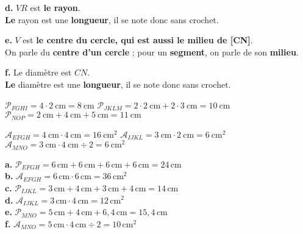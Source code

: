 \documentclass[a4paper,12pt]{report}
\begin{document}
\begin{Correction}
\begin{EXO}{}{}
\medskip
\textbf {d.} $VR$ est {\bfseries \color[HTML]{f15929}le rayon}.\\{\bfseries \color{blue}Le} rayon est une {\bfseries \color{blue}longueur}, il se note donc sans crochet.

\medskip
\textbf {e.} $V$ est {\bfseries \color[HTML]{f15929}le centre du cercle, qui est aussi le milieu de [CN]}.\\On parle du {\bfseries \color{blue}centre d'un cercle} ; pour un {\bfseries \color{blue}segment}, on parle de son {\bfseries \color{blue}milieu}.

\medskip
\textbf {f.} Le diamètre est {\bfseries \color[HTML]{f15929}$CN$}.\\{\bfseries \color{blue}Le} diamètre est une {\bfseries \color{blue}longueur}, il se note donc sans crochet.

\medskip

\end{EXO}

\begin{EXO}{}{}

 $\mathcal{P}_{FGHI}=4\cdot 2~\text{cm}=8~\text{cm}$
 $\mathcal{P}_{JKLM}=2\cdot 2~\text{cm} + 2\cdot3~\text{cm}=10~\text{cm}$
 $\mathcal{P}_{NOP}=2~\text{cm} + 4~\text{cm} + 5~\text{cm} =11~\text{cm}$
\end{EXO}

\begin{EXO}{}{}

 $\mathcal{A}_{EFGH}=4~\text{cm}\cdot4~\text{cm}=16~\text{cm}^2$
 $\mathcal{A}_{IJKL}=3~\text{cm}\cdot2~\text{cm}=6~\text{cm}^2$
 $\mathcal{A}_{MNO}=3~\text{cm}\cdot4~\text{cm}\div2=6~\text{cm}^2$
\end{EXO}

\begin{EXO}{}{}

 \textbf {a.} $\mathcal{P}_{EFGH}=6\,\text{cm}+6\,\text{cm}+6\,\text{cm}+6\,\text{cm}=24\,\text{cm}$\\\textbf {b.} $\mathcal{A}_{EFGH}=6\,\text{cm}\cdot6\,\text{cm}=36\,\text{cm}^2$\\\textbf {c.} $\mathcal{P}_{IJKL}=3\,\text{cm}+4\,\text{cm}+3\,\text{cm}+4\,\text{cm}=14\,\text{cm}$\\\textbf {d.} $\mathcal{A}_{IJKL}=3\,\text{cm}\cdot4\,\text{cm}=12\,\text{cm}^2$\\\textbf {e.} $\mathcal{P}_{MNO}=5\,\text{cm}+4\,\text{cm}+6{,}4\,\text{cm}=15{,}4\,\text{cm}$\\\textbf {f.} $\mathcal{A}_{MNO}=5\,\text{cm}\cdot4\,\text{cm}\div2=10\,\text{cm}^2$\\
\end{EXO}


\end{Correction}
\end{document}
